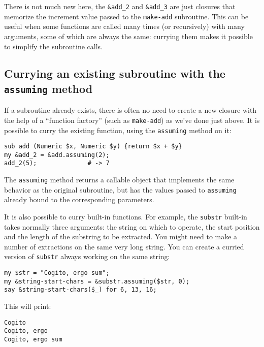 There is not much new here, the \verb'&add_2' and 
\verb'&add_3' are just closures that memorize the 
increment value passed to the {\tt make-add} 
subroutine. This can be useful when some functions 
are called many times (or recursively) with many  
arguments, some of which are always the same: 
currying them makes it possible to simplify the 
subroutine calls.

\subsection{Currying an existing subroutine with the {\tt assuming} method}

If a subroutine already exists, there is often no need 
to create a new closure with the help of a ``function 
factory'' (such as {\tt make-add}) as we've done just above. 
It is possible to curry the existing function, using 
the {\tt assuming} method on it:

\begin{verbatim}
sub add (Numeric $x, Numeric $y) {return $x + $y}   
my &add_2 = &add.assuming(2);                       
add_2(5);              # -> 7                                     
\end{verbatim}

The {\tt assuming} method returns a callable object 
that implements the same behavior as the original 
subroutine, but has the values passed to {\tt assuming}
already bound to the corresponding parameters.

It is also possible to curry built-in functions. For example, 
the {\tt substr} built-in takes normally three arguments:
the string on which to operate, the start position and the 
length of the substring to be extracted. You might need 
to make a number of extractions on the same very long 
string. You can create a curried version of {\tt substr} 
always working on the same string:

\begin{verbatim}
my $str = "Cogito, ergo sum";                     
my &string-start-chars = &substr.assuming($str, 0);
say &string-start-chars($_) for 6, 13, 16; 
\end{verbatim}

This will print:

\begin{verbatim}
Cogito
Cogito, ergo
Cogito, ergo sum
\end{verbatim}

